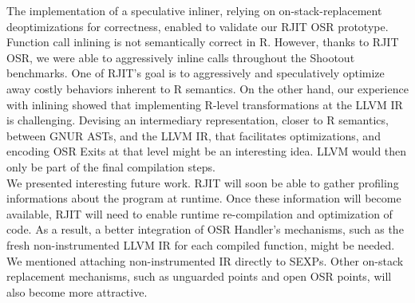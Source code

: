 The implementation of a speculative inliner, relying on on-stack-replacement deoptimizations for correctness, enabled to validate our RJIT OSR prototype. 
Function call inlining is not semantically correct in R.
However, thanks to RJIT OSR, we were able to aggressively inline calls throughout the Shootout benchmarks\cite{Shootout}.
One of RJIT's goal is to aggressively and speculatively optimize away costly behaviors inherent to R semantics.
On the other hand, our experience with inlining showed that implementing R-level transformations at the LLVM IR is challenging.
Devising an intermediary representation, closer to R semantics, between GNUR ASTs, and the LLVM IR, that facilitates optimizations, and encoding OSR Exits at that level might be an interesting idea.
LLVM would then only be part of the final compilation steps.\\

We presented interesting future work.
RJIT will soon be able to gather profiling informations about the program at runtime. 
Once these information will become available, RJIT will need to enable runtime re-compilation and optimization of code.
As a result, a better integration of OSR Handler's mechanisms, such as the fresh non-instrumented LLVM IR for each compiled function, might be needed. 
We mentioned attaching non-instrumented IR directly to SEXPs.
Other on-stack replacement mechanisms, such as unguarded points and open OSR points, will also become more attractive.\\